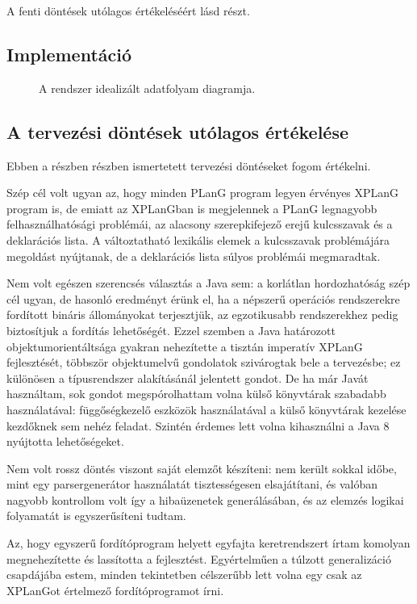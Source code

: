 A fenti döntések utólagos értékeléséért lásd  részt.


\subsection{Implementáció}

\begin{figure}[htb]
	\centering
	\resizebox{\textwidth}{!}{}
	\caption{A rendszer idealizált adatfolyam diagramja.}
\end{figure}


\subsection{A tervezési döntések utólagos értékelése} \label{subsec:planres}
Ebben a részben  részben ismertetett tervezési döntéseket fogom értékelni.

Szép cél volt ugyan az, hogy minden PLanG program legyen érvényes XPLanG program is, de emiatt az XPLanGban is megjelennek a PLanG legnagyobb felhasználhatósági problémái, az alacsony szerepkifejező erejű kulcsszavak és a deklarációs lista.
A változtatható lexikális elemek a kulcsszavak problémájára megoldást nyújtanak, de a deklarációs lista súlyos problémái megmaradtak.

Nem volt egészen szerencsés választás a Java sem: a korlátlan hordozhatóság szép cél ugyan, de hasonló eredményt érünk el, ha a népszerű operációs rendszerekre fordított bináris állományokat terjesztjük, az egzotikusabb rendszerekhez pedig biztosítjuk a fordítás lehetőségét.
Ezzel szemben a Java határozott objektumorientáltsága gyakran nehezítette a tisztán imperatív XPLanG fejlesztését, többször objektumelvű gondolatok szivárogtak bele a tervezésbe; ez különösen a típusrendszer alakításánál jelentett gondot.
De ha már Javát használtam, sok gondot megspórolhattam volna külső könyvtárak szabadabb használatával: függőségkezelő eszközök használatával a külső könyvtárak kezelése kezdőknek sem nehéz feladat.
Szintén érdemes lett volna kihasználni a Java 8 nyújtotta lehetőségeket.

Nem volt rossz döntés viszont saját elemzőt készíteni: nem került sokkal időbe, mint egy parsergenerátor használatát tisztességesen elsajátítani, és valóban nagyobb kontrollom volt így a hibaüzenetek generálásában, és az elemzés logikai folyamatát is egyszerűsíteni tudtam.

Az, hogy egyszerű fordítóprogram helyett egyfajta keretrendszert írtam komolyan megnehezítette és lassította a fejlesztést.
Egyértelműen a túlzott generalizáció csapdájába estem, minden tekintetben célszerűbb lett volna egy csak az XPLanGot értelmező fordítóprogramot írni.



%
